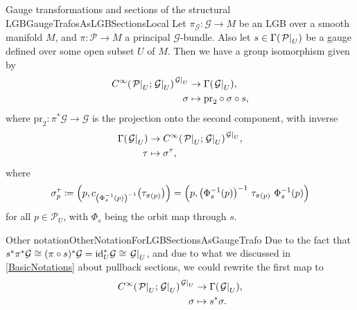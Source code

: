 \documentclass[reqno,a4paper,oneside]{amsart}
\theoremstyle{plain}
\theoremstyle{remark}
\theoremstyle{definition}
\begin{document}
\begin{propositions}{Gauge transformations and sections of the structural LGB}{GaugeTrafosAsLGBSectionsLocal}
Let $\pi_{\mathcal{G}}\colon\mathcal{G} \to M$ be an LGB over a smooth manifold $M$, and $\pi\colon\mathcal{P} \to M$ a principal $\mathcal{G}$-bundle. Also let $s \in \Gamma\mleft(\mleft.\mathcal{P}\mright|_U\mright)$ be a gauge defined over some open subset $U$ of $M$. Then we have a group isomorphism given by
\begin{align*}
C^\infty \mleft( \mleft.\mathcal{P}\mright|_U; \mleft.\mathcal{G}\mright|_U \mright)^{\mleft.\mathcal{G}\mright|_U} 
&\to 
\Gamma\mleft(\mleft.\mathcal{G}\mright|_U\mright),
\\
\sigma &\mapsto \mathrm{pr}_2 \circ \sigma \circ s,
\end{align*}
where $\mathrm{pr}_2\colon \pi^*\mathcal{G} \to \mathcal{G}$ is the projection onto the second component,
with inverse
\begin{align*}
\Gamma\mleft(\mleft.\mathcal{G}\mright|_U\mright)
&\to
C^\infty \mleft( \mleft.\mathcal{P}\mright|_U; \mleft.\mathcal{G}\mright|_U \mright)^{\mleft.\mathcal{G}\mright|_U},
\\ 
\tau &\mapsto \sigma^\tau,
\end{align*}
where 
\begin{equation*}
\sigma^\tau_p
\coloneqq
\mleft(p, c_{\mleft(\Phi^{-1}_{s}(p)\mright)^{-1}} \mleft( \tau_{\pi(p)} \mright) \mright)
=
\mleft(p, \mleft(\Phi^{-1}_{s}(p)\mright)^{-1} ~ \tau_{\pi(p)} ~ \Phi^{-1}_{s}(p) \mright)
\end{equation*}
for all $p \in \mathcal{P}_U$,
with $\Phi_s$ being the orbit map through $s$.
\end{propositions}

\begin{remarks}{Other notation}{OtherNotationForLGBSectionsAsGaugeTrafo}
Due to the fact that $s^*\pi^*\mathcal{G} \cong (\pi \circ s)^*\mathcal{G} = \mathrm{id}_U^*\mathcal{G} \cong \mleft.\mathcal{G}\mright|_U$, and due to what we discussed in \ref{BasicNotations} about pullback sections, we could rewrite the first map to
\begin{align*}
C^\infty \mleft( \mleft.\mathcal{P}\mright|_U; \mleft.\mathcal{G}\mright|_U \mright)^{\mleft.\mathcal{G}\mright|_U} 
&\to 
\Gamma\mleft(\mleft.\mathcal{G}\mright|_U\mright),
\\
\sigma &\mapsto s^*\sigma.
\end{align*}
\end{remarks}
\end{document}
